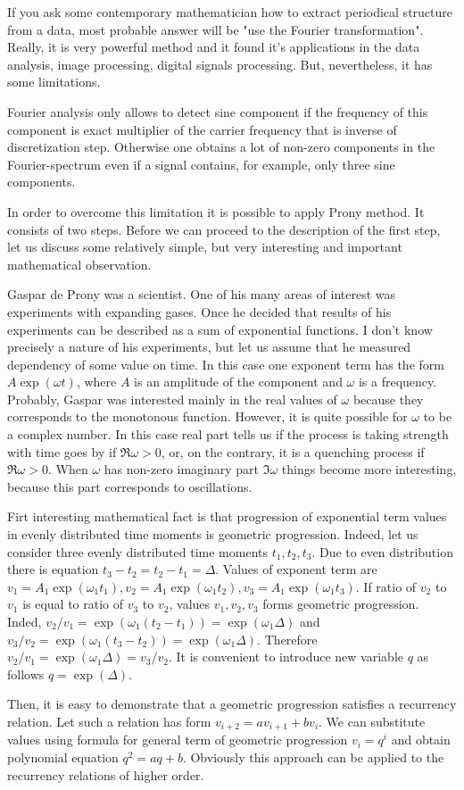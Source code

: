 \documentclass[14pt]{extarticle}
\begin{document}
If you ask some contemporary mathematician how to extract
periodical structure from a data, most probable answer will
be "use the Fourier transformation". Really, it is very
powerful method and it found it's applications in the
data analysis, image processing, digital signals processing.
But, nevertheless, it has some limitations.

Fourier analysis only allows to detect sine component if
the frequency of this component is exact multiplier
of the carrier frequency that is inverse of discretization
step. Otherwise one obtains a lot of non-zero components
in the Fourier-spectrum even if a signal contains, for example,
only three sine components.

In order to overcome this limitation it is possible to apply
Prony method. It consists of two steps. Before we can proceed
to the description of the first step, let us discuss some relatively
simple, but very interesting and important mathematical observation.

Gaspar de Prony was a scientist. One of his many areas of interest was
experiments with expanding gases. Once he decided that results of his
experiments can be described as a sum of exponential functions. I don't
know precisely a nature of his experiments, but let us assume that he
measured dependency of some value on time. In this case one exponent term
has the form $A\exp(\omega t)$, where $A$ is an amplitude of the component and
$\omega$ is a frequency. Probably, Gaspar was interested mainly in the real
values of $\omega$ because they corresponds to the monotonous function.
However, it is quite possible for $\omega$ to be a complex number. In this case
real part tells us if the process is taking strength with time goes by if \(\Re \omega > 0\), or,
on the contrary, it is a quenching process if \(\Re \omega > 0\). When \(\omega\)
has non-zero imaginary part $\Im \omega$ things become more interesting, because
this part corresponds to oscillations.

Firt interesting mathematical fact is that progression of exponential term values in evenly distributed time moments
is geometric progression. Indeed, let us consider three evenly distributed time moments 
$t_1, t_2, t_3$. Due to even distribution there is equation $t_3 - t_2 = t_2 - t_1 = \Delta$.
Values of exponent term are \(v_1 = A_1\exp(\omega_1 t_1), v_2 = A_1\exp(\omega_1 t_2), v_3 = A_1\exp(\omega_1 t_3)\).
If ratio of \(v_2\) to \(v_1\) is equal to ratio of \(v_3\) to \(v_2\), values \(v_1, v_2, v_3\) forms geometric progression.
Inded, \(v_2/v_1 = \exp(\omega_1(t_2 - t_1)) = \exp(\omega_1\Delta)\) and \(v_3/v_2 = \exp(\omega_1(t_3 - t_2)) = \exp(\omega_1\Delta)\).
Therefore \(v_2/v_1 = \exp(\omega_1\Delta) = v_3/v_2\). It is convenient to introduce
new variable \(q\) as follows \(q = \exp (\Delta)\).

Then, it is easy to demonstrate that a geometric progression satisfies a recurrency relation.
Let such a relation has form $v_{i+2} = a v_{i+1} + b v_{i}$. We can substitute values using
formula for general term of geometric progression \(v_i = q^i\) and obtain polynomial equation
\(q^2 = a q + b\). Obviously this approach can be applied to the recurrency relations of
higher order.
\end{document}
